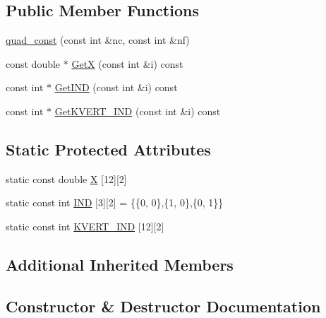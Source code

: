 \subsection*{Public Member Functions}
\begin{DoxyCompactItemize}
\item 
\mbox{\hyperlink{classfemus_1_1quad__const_ab44963232941ab6334d2e41c1037a3f2}{quad\+\_\+const}} (const int \&nc, const int \&nf)
\item 
const double $\ast$ \mbox{\hyperlink{classfemus_1_1quad__const_ae81971dbef2943442e4c10debc5bfa08}{GetX}} (const int \&i) const
\item 
const int $\ast$ \mbox{\hyperlink{classfemus_1_1quad__const_a44c52292981696a6f8b36a0b3de5598b}{Get\+I\+ND}} (const int \&i) const
\item 
const int $\ast$ \mbox{\hyperlink{classfemus_1_1quad__const_a1254abf3bc41679deaa514fcd63138a0}{Get\+K\+V\+E\+R\+T\+\_\+\+I\+ND}} (const int \&i) const
\end{DoxyCompactItemize}
\subsection*{Static Protected Attributes}
\begin{DoxyCompactItemize}
\item 
static const double \mbox{\hyperlink{classfemus_1_1quad__const_a7850c4c850fa87c3238e94265ced07ba}{X}} \mbox{[}12\mbox{]}\mbox{[}2\mbox{]}
\item 
static const int \mbox{\hyperlink{classfemus_1_1quad__const_ad37e487e43089511f153acaab50fcbef}{I\+ND}} \mbox{[}3\mbox{]}\mbox{[}2\mbox{]} = \{\{0, 0\},\{1, 0\},\{0, 1\}\}
\item 
static const int \mbox{\hyperlink{classfemus_1_1quad__const_a5d40c13ef8a2bd5542361c5c4cf7d0a8}{K\+V\+E\+R\+T\+\_\+\+I\+ND}} \mbox{[}12\mbox{]}\mbox{[}2\mbox{]}
\end{DoxyCompactItemize}
\subsection*{Additional Inherited Members}


\subsection{Constructor \& Destructor Documentation}
\mbox{\label{classfemus_1_1quad__const_ab44963232941ab6334d2e41c1037a3f2}} 
